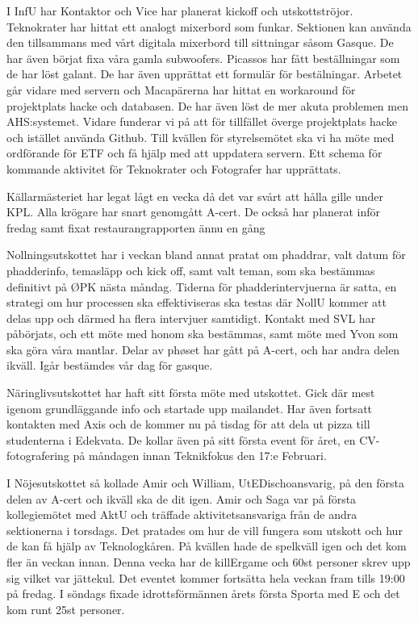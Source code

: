 \documentclass[10pt]{article}
\begin{document}
\begin{paragrafer}
\begin{paragrafer}
I InfU har Kontaktor och Vice har planerat kickoff och utskottströjor.
Teknokrater har hittat ett analogt mixerbord som funkar. Sektionen kan använda den tillsammans med vårt digitala mixerbord till sittningar såsom Gasque. De har även börjat fixa våra gamla subwoofers.
Picassos har fått beställningar som de har löst galant. De har även upprättat ett formulär för bestälningar.
Arbetet går vidare med servern och Macapärerna har hittat en workaround för projektplats hacke och databasen. De har även löst de mer akuta problemen men AHS:systemet.
Vidare funderar vi på att för tillfället överge projektplats hacke och istället använda Github.
Till kvällen för styrelsemötet ska vi ha möte med ordförande för ETF och få hjälp med att uppdatera servern.
Ett schema för kommande aktivitet för Teknokrater och Fotografer har upprättats.

Källarmästeriet har legat lågt en vecka då det var svårt att hålla gille under KPL. Alla krögare har snart genomgått A-cert. De också har planerat inför fredag samt fixat restaurangrapporten ännu en gång

Nollningsutskottet har i veckan bland annat pratat om phaddrar, valt datum för phadderinfo, temasläpp och kick off, samt valt teman, som ska bestämmas definitivt på ØPK nästa måndag. Tiderna för phadderintervjuerna är satta, en strategi om hur processen ska effektiviseras ska testas där NollU kommer att delas upp och därmed ha flera intervjuer samtidigt. 
Kontakt med SVL har påbörjats, och ett möte med honom ska bestämmas, samt möte med Yvon som ska göra våra mantlar. 
Delar av phøset har gått på A-cert, och har andra delen ikväll. Igår bestämdes vår dag för gasque.

Näringlivsutskottet har haft sitt första möte med utskottet. Gick där mest igenom grundläggande info och startade upp mailandet. Har även fortsatt kontakten med Axis och de kommer nu på tisdag för att dela ut pizza till studenterna i Edekvata. De kollar även på sitt första event för året, en CV-fotografering på måndagen innan Teknikfokus den 17:e Februari.

I Nöjesutskottet så kollade Amir och William, UtEDischoansvarig, på den första delen av A-cert och ikväll ska de dit igen. Amir och Saga var på första kollegiemötet med AktU och träffade aktivitetsansvariga från de andra sektionerna i torsdags. Det pratades om hur de vill fungera som utskott och hur de kan få hjälp av Teknologkåren. På kvällen hade de spelkväll igen och det kom fler än veckan innan. Denna vecka har de killErgame och 60st personer skrev upp sig vilket var jättekul. Det eventet kommer fortsätta hela veckan fram tills 19:00 på fredag. I söndags fixade idrottsförmännen årets första Sporta med E och det kom runt 25st personer. 


\end{paragrafer}
\end{paragrafer}
\end{document}
